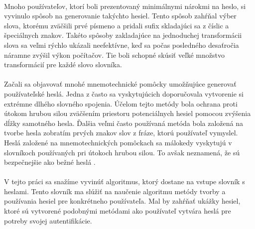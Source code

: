 \paragraph{}
Mnoho používateľov, ktorí boli prezentovaný minimálnymi nárokmi na heslo, si vyvinulo spôsob na generovanie takýchto hesiel. Tento spôsob zahŕňal výber slova, ktorému zväčšili prvé písmeno a pridali sufix skladajúci sa z číslic a špeciálnych znakov. Takéto spôsoby zakladajúce na jednoduchej transformácii slova sa veľmi rýchlo ukázali neefektívne, keď sa počas posledného desaťročia náramne zvýšil výkon počítačov. Tie boli schopné skúsiť veľké množstvo transformácií pre každé slovo slovníka.

\paragraph{}
Začali sa objavovať mnohé mnemotechnické pomôcky umožňujúce generovať používateľské heslá. Jedna z často sa vyskytujúcich doporučovala vytvorenie si extrémne dlhého slovného spojenia. Účelom tejto metódy bola ochrana proti útokom hrubou silou zväčšením priestoru potenciálnych hesiel pomocou zvýšenia dĺžky samotného hesla. Ďalšia veľmi často používaná metóda bola založená na tvorbe hesla zobratím prvých znakov slov z fráze, ktorú používateľ vymyslel. Heslá založené na mnemotechnických pomôckach sa málokedy vyskytujú v slovníkoch používaných pri útokoch hrubou silou. To avšak neznamená, že sú bezpečnejšie ako bežné heslá \cite{Kuo:2006:HSM:1143120.1143129}.

\paragraph{}
V tejto práci sa snažíme vyvinúť algoritmus, ktorý dostane na vstupe slovník s heslami. Tento slovník ma slúžiť na naučenie algoritmu metódy tvorby a používania hesiel pre konkrétneho používateľa. Mal by zahŕňať ukážky hesiel, ktoré sú vytvorené podobnými metódami ako používateľ vytvára heslá pre potreby svojej autentifikácie.
